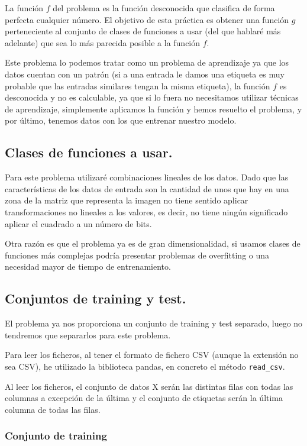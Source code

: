 \documentclass[12pt, spanish]{article}
\begin{document}
La función $f$ del problema es la función desconocida que clasifica de forma perfecta cualquier número. El objetivo de esta práctica es obtener una función $g$ perteneciente al conjunto de clases de funciones a usar (del que hablaré más adelante) que sea lo más parecida posible a la función $f$.

Este problema lo podemos tratar como un problema de aprendizaje ya que los datos cuentan con un patrón (si a una entrada le damos una etiqueta es muy probable que las entradas similares tengan la misma etiqueta), la función $f$ es desconocida y no es calculable, ya que si lo fuera no necesitamos utilizar técnicas de aprendizaje, simplemente aplicamos la función y hemos resuelto el problema, y por último, tenemos datos con los que entrenar nuestro modelo.

\subsection{Clases de funciones a usar.}

Para este problema utilizaré combinaciones lineales de los datos. Dado que las características de los datos de entrada son la cantidad de unos que hay en una zona de la matriz que representa la imagen no tiene sentido aplicar transformaciones no lineales a los valores, es decir, no tiene ningún significado aplicar el cuadrado a un número de bits.

Otra razón es que el problema ya es de gran dimensionalidad, si usamos clases de funciones más complejas podría presentar problemas de overfitting o una necesidad mayor de tiempo de entrenamiento.

\subsection{Conjuntos de training y test.}

El problema ya nos proporciona un conjunto de training y test separado, luego no tendremos que separarlos para este problema.

Para leer los ficheros, al tener el formato de fichero CSV (aunque la extensión no sea CSV), he utilizado la biblioteca pandas, en concreto el método \texttt{read\_csv}\cite{pandasReadCSV}.

Al leer los ficheros, el conjunto de datos X serán las distintas filas con todas las columnas a excepción de la última y el conjunto de etiquetas serán la última columna de todas las filas.

\subsubsection{Conjunto de training}
\end{document}
